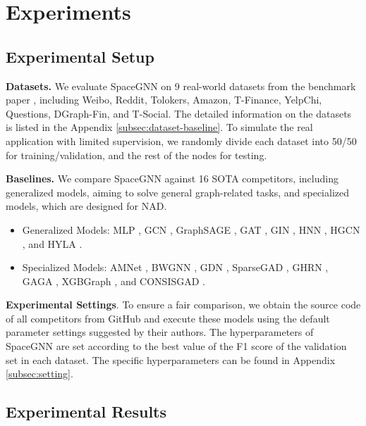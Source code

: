 \section{Experiments}
\label{sec:experiments}

\subsection{Experimental Setup}
\label{subsec:setup}
\textbf{Datasets.} We evaluate SpaceGNN on 9 real-world datasets from the benchmark paper \citep{gadbench23tang}, including Weibo, Reddit, Tolokers, Amazon, T-Finance, YelpChi, Questions, DGraph-Fin, and T-Social. The detailed information on the datasets is listed in the Appendix \ref{subsec:dataset-baseline}. To simulate the real application with limited supervision, we randomly divide each dataset into 50/50 for training/validation, and the rest of the nodes for testing. 

\textbf{Baselines.} 
We compare SpaceGNN against 16 SOTA competitors, including generalized models, aiming to solve general graph-related tasks, and specialized models, which are designed for NAD. 
\begin{itemize} [topsep=0.5mm, partopsep=0pt, itemsep=0pt, leftmargin=10pt]
    \item Generalized Models: MLP \citep{mlp58f}, GCN \citep{gcn17kipf}, GraphSAGE \citep{graphsage17hamilton}, GAT \citep{gat18velickovic}, GIN \citep{gin19xu}, HNN \citep{hnn18ganea}, HGCN \citep{hgcn19chami}, and HYLA \citep{hyla23yu}. 
    \item Specialized Models: AMNet \citep{amnet22chai}, BWGNN \citep{bwgnn22tang}, GDN \citep{gdn23gao}, SparseGAD \citep{sparsegad23gong}, GHRN \citep{ghrn23gao}, GAGA \citep{gaga23wang}, XGBGraph \citep{gadbench23tang}, and CONSISGAD \citep{consisgad24chen}. 
\end{itemize}

\textbf{Experimental Settings}. To ensure a fair comparison, we obtain the source code of all competitors from GitHub and execute these models using the default parameter settings suggested by their authors. The hyperparameters of SpaceGNN are set according to the best value of the F1 score of the validation set in each dataset. The specific hyperparameters can be found in Appendix \ref{subsec:setting}.
  
\subsection{Experimental Results}
\label{subsec:results}

